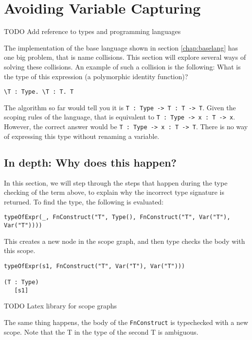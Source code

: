
\chapter{\label{chap:namecolls}Avoiding Variable Capturing}

TODO Add reference to types and programming languages

The implementation of the base language shown in section \ref{chap:baselang} has one big problem, that is name collisions. This section will explore several ways of solving these collisions. An example of such a collision is the following: What is the type of this expression (a polymorphic identity function)?
\begin{lstlisting}
\T : Type. \T : T. T
\end{lstlisting}

The algorithm so far would tell you it is \verb|T : Type -> T : T -> T|. Given the scoping rules of the language, that is equivalent to \verb|T : Type -> x : T -> x|. However, the correct answer would be \verb|T : Type -> x : T -> T|. There is no way of expressing this type without renaming a variable.

\section{In depth: Why does this happen?}

In this section, we will step through the steps that happen during the type checking of the term above, to explain why the incorrect type signature is returned. To find the type, the following is evaluated:

\begin{lstlisting}
typeOfExpr(_, FnConstruct("T", Type(), FnConstruct("T", Var("T"), Var("T"))))
\end{lstlisting}

\noindent
This creates a new node in the scope graph, and then type checks the body with this scope.

\begin{lstlisting}
typeOfExpr(s1, FnConstruct("T", Var("T"), Var("T")))

(T : Type)
   [s1]
\end{lstlisting}
TODO Latex library for scope graphs

\noindent
The same thing happens, the body of the \verb|FnConstruct| is typechecked with a new scope. Note that the T in the type of the second T is ambiguous.

